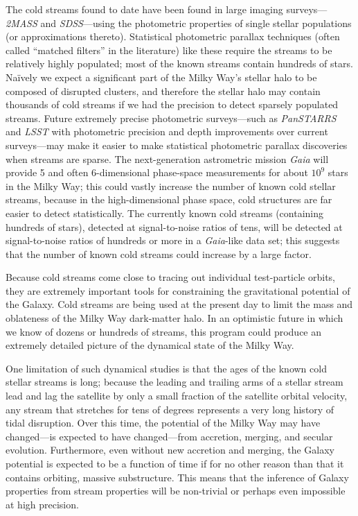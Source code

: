 \documentclass[12pt,preprint]{aastex}
\newcommand{\project}[1]{\textsl{#1}}
\begin{document}
The cold streams found to date have been found in large imaging
surveys---\project{2MASS} and \project{SDSS}---using the photometric
properties of single stellar populations (or approximations thereto).
Statistical photometric parallax techniques (often called ``matched
filters'' in the literature) like these require the streams to be
relatively highly populated; most of the known streams contain
hundreds of stars.  Na\"ively we expect a significant part of the
Milky Way's stellar halo to be composed of disrupted clusters, and
therefore the stellar halo may contain thousands of cold streams if we
had the precision to detect sparsely populated streams.  Future
extremely precise photometric surveys---such as \project{PanSTARRS}
and \project{LSST} with photometric precision and depth improvements
over current surveys---may make it easier to make statistical
photometric parallax discoveries when streams are sparse.  The
next-generation astrometric mission \project{Gaia} will provide 5 and
often 6-dimensional phase-space measurements for about $10^9$ stars in
the Milky Way; this could vastly increase the number of known cold
stellar streams, because in the high-dimensional phase space, cold
structures are far easier to detect statistically.  The currently
known cold streams (containing hundreds of stars), detected at
signal-to-noise ratios of tens, will be detected at signal-to-noise
ratios of hundreds or more in a \project{Gaia}-like data set; this
suggests that the number of known cold streams could increase by a
large factor.

Because cold streams come close to tracing out individual
test-particle orbits, they are extremely important tools for
constraining the gravitational potential of the Galaxy.  Cold streams
are being used at the present day to limit the mass and oblateness of
the Milky Way dark-matter halo.  In an optimistic future in which we
know of dozens or hundreds of streams, this program could produce an
extremely detailed picture of the dynamical state of the Milky Way.

One limitation of such dynamical studies is that the ages of the known
cold stellar streams is long; because the leading and trailing arms of
a stellar stream lead and lag the satellite by only a small fraction
of the satellite orbital velocity, any stream that stretches for tens
of degrees represents a very long history of tidal disruption.  Over
this time, the potential of the Milky Way may have changed---is
expected to have changed---from accretion, merging, and secular
evolution.  Furthermore, even without new accretion and merging, the
Galaxy potential is expected to be a function of time if for no other
reason than that it contains orbiting, massive substructure.  This
means that the inference of Galaxy properties from stream properties
will be non-trivial or perhaps even impossible at high precision.
\end{document}
